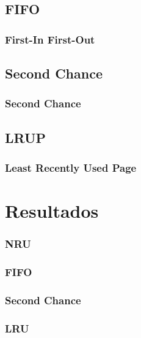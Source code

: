 \documentclass{beamer}
\begin{document}
\subsection{FIFO} 

\begin{frame}
\frametitle{First-In First-Out}

\justifying

\end{frame}

\subsection{Second Chance} 

\begin{frame}
\frametitle{Second Chance}

\justifying
\end{frame}

\subsection{LRUP}
\begin{frame}
\frametitle{Least Recently Used Page}


\justifying
\end{frame}
\section{Resultados} 

\begin{frame}
\frametitle{NRU} 
\justifying
\end{frame}

\begin{frame}
\frametitle{FIFO} 
\justifying
\end{frame}

\begin{frame}
\frametitle{Second Chance} 
\justifying
\end{frame}

\begin{frame}
\frametitle{LRU} 
\justifying
\end{frame}
\end{document}
